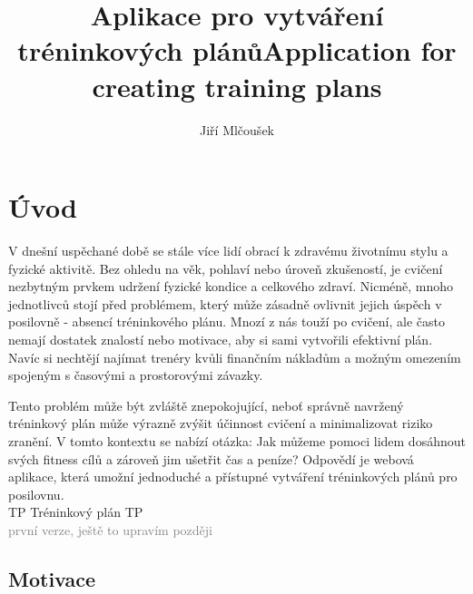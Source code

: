 \documentclass[
  field=inf,
  biblatex,
  glossaries,
  index
]{kidiplom}
\title{Aplikace pro vytváření tréninkových plánů}
\title[english]{Application for creating training plans}
\author{Jiří Mlčoušek}
\begin{document}
\maketitle



\newcommand{\BibLaTeX}{\textsc{Bib}\LaTeX}



\section{Úvod}
V dnešní uspěchané době se stále více lidí obrací k zdravému životnímu stylu a fyzické aktivitě. Bez ohledu na věk, pohlaví nebo úroveň zkušeností, je cvičení nezbytným prvkem udržení fyzické kondice a celkového zdraví. Nicméně, mnoho jednotlivců stojí před problémem, který může zásadně ovlivnit jejich úspěch v posilovně - absencí tréninkového plánu. Mnozí z nás touží po cvičení, ale často nemají dostatek znalostí nebo motivace, aby si sami vytvořili efektivní plán. Navíc si nechtějí najímat trenéry kvůli finančním nákladům a možným omezením spojeným s časovými a prostorovými závazky.

Tento problém může být zvláště znepokojující, neboť správně navržený tréninkový plán může výrazně zvýšit účinnost cvičení a minimalizovat riziko zranění. V tomto kontextu se nabízí otázka: Jak můžeme pomoci lidem dosáhnout svých fitness cílů a zároveň jim ušetřit čas a peníze? Odpovědí je webová aplikace, která umožní jednoduché a přístupné vytváření tréninkových plánů pro posilovnu.\\

 {TP} {Tréninkový plán} \gls{TP} \\
\noindent\textcolor{gray}{první verze, ještě to upravím později}



\subsection{Motivace}
\end{document}
